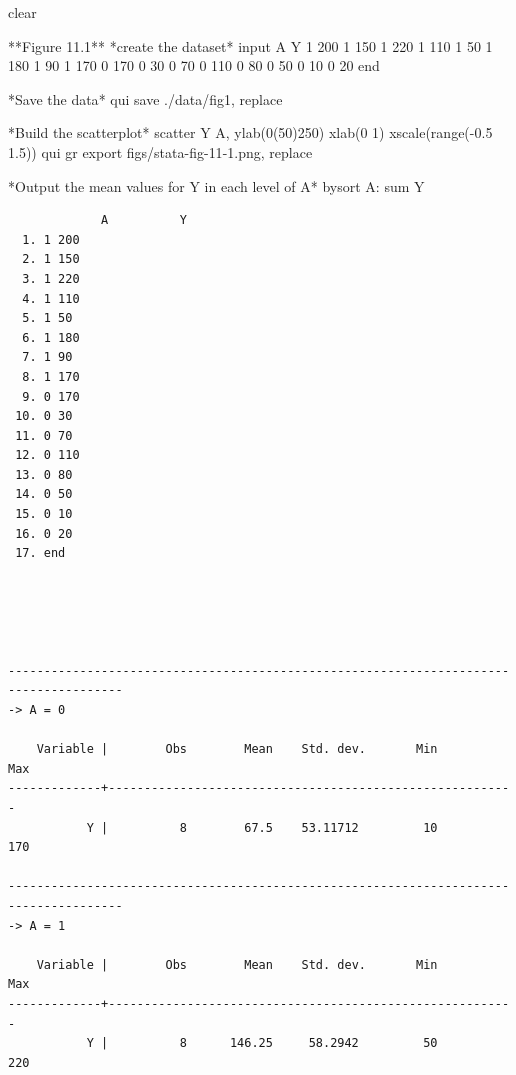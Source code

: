 \documentclass[
  10pt,
  a4paper,
]{book}
\newenvironment{Shaded}{\begin{snugshade}}{\end{snugshade}}
\newcommand{\BaseNTok}[1]{\textcolor[rgb]{0.68,0.00,0.00}{#1}}
\newcommand{\DecValTok}[1]{\textcolor[rgb]{0.68,0.00,0.00}{#1}}
\newcommand{\KeywordTok}[1]{\textcolor[rgb]{0.00,0.46,0.62}{#1}}
\newcommand{\NormalTok}[1]{\textcolor[rgb]{0.00,0.46,0.62}{#1}}
\begin{document}
\begin{Shaded}
\begin{Highlighting}[]
\KeywordTok{clear}

\NormalTok{**Figure 11.1**}
\NormalTok{*create the dataset*}
\NormalTok{input A Y}
\NormalTok{1 200}
\NormalTok{1 150}
\NormalTok{1 220}
\NormalTok{1 110}
\NormalTok{1 50}
\NormalTok{1 180}
\NormalTok{1 90}
\NormalTok{1 170}
\NormalTok{0 170}
\NormalTok{0 30}
\NormalTok{0 70}
\NormalTok{0 110}
\NormalTok{0 80}
\NormalTok{0 50}
\NormalTok{0 10}
\NormalTok{0 20}
\KeywordTok{end}

\NormalTok{*Save the }\KeywordTok{data}\NormalTok{*}
\KeywordTok{qui} \KeywordTok{save}\NormalTok{ ./}\KeywordTok{data}\NormalTok{/fig1, }\KeywordTok{replace}

\NormalTok{*Build the scatterplot*}
\KeywordTok{scatter}\NormalTok{ Y A, ylab(0(50)250) xlab(0 1) }\BaseNTok{xscale}\NormalTok{(}\KeywordTok{range}\NormalTok{({-}0.5 1.5))}
\KeywordTok{qui} \KeywordTok{gr} \KeywordTok{export}\NormalTok{ figs/stata{-}fig{-}11{-}1.png, }\KeywordTok{replace}

\NormalTok{*Output the }\KeywordTok{mean} \KeywordTok{values} \KeywordTok{for}\NormalTok{ Y }\KeywordTok{in}\NormalTok{ each }\DecValTok{level} \KeywordTok{of}\NormalTok{ A*}
\KeywordTok{bysort}\NormalTok{ A: }\KeywordTok{sum}\NormalTok{ Y}
\end{Highlighting}
\end{Shaded}

\begin{verbatim}
             A          Y
  1. 1 200
  2. 1 150
  3. 1 220
  4. 1 110
  5. 1 50
  6. 1 180
  7. 1 90
  8. 1 170
  9. 0 170
 10. 0 30
 11. 0 70
 12. 0 110
 13. 0 80
 14. 0 50
 15. 0 10
 16. 0 20
 17. end





--------------------------------------------------------------------------------------
-> A = 0

    Variable |        Obs        Mean    Std. dev.       Min        Max
-------------+---------------------------------------------------------
           Y |          8        67.5    53.11712         10        170

--------------------------------------------------------------------------------------
-> A = 1

    Variable |        Obs        Mean    Std. dev.       Min        Max
-------------+---------------------------------------------------------
           Y |          8      146.25     58.2942         50        220
\end{verbatim}
\end{document}
